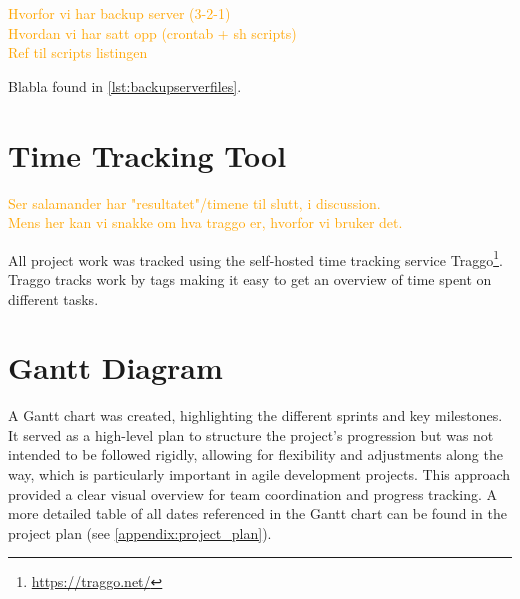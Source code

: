 \textcolor{orange}{
Hvorfor vi har backup server (3-2-1) \\
Hvordan vi har satt opp (crontab + sh scripts) \\
Ref til scripts listingen
}

\begin{figure}[h]

\end{figure}

Blabla found in \autoref{lst:backupserverfiles}.

\begin{figure}[h]

\end{figure}

\section{Time Tracking Tool}

\textcolor{orange}{
Ser salamander har "resultatet"/timene til slutt, i discussion. \\
Mens her kan vi snakke om hva traggo er, hvorfor vi bruker det.
}

All project work was tracked using the self-hosted time tracking service Traggo\footnote{\url{https://traggo.net/}}. Traggo tracks work by tags making it easy to get an overview of time spent on different tasks.

\section{Gantt Diagram}

A Gantt chart was created, highlighting the different sprints and key milestones. It served as a high-level plan to structure the project's progression but was not intended to be followed rigidly, allowing for flexibility and adjustments along the way, which is particularly important in agile development projects. This approach provided a clear visual overview for team coordination and progress tracking. A more detailed table of all dates referenced in the Gantt chart can be found in the project plan (see \autoref{appendix:project_plan}).

